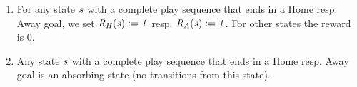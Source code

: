 \documentclass[]{article}
\begin{document}


\begin{enumerate}
\item For any state $s$ with a complete play sequence that ends in a Home resp. Away goal, we set $\it{R}_{H}(s) := 1$ resp. $\it{R}_{A}(s) := 1$. For other states the reward is 0.
\item Any state $s$ with a complete play sequence that ends in a Home resp. Away goal is an absorbing state (no transitions from this state).
\end{enumerate}
%
\end{document}

